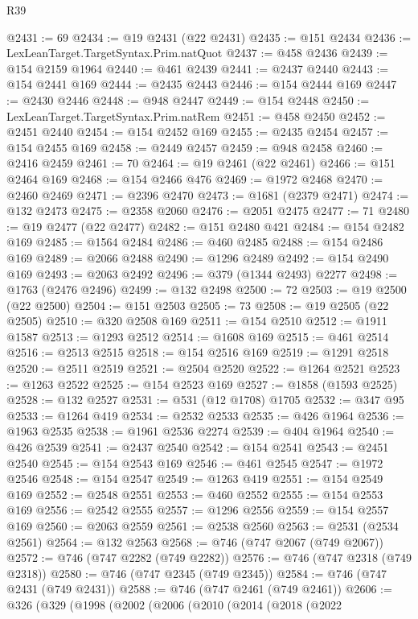 \begin{lexlean}{R39}
\begin{coremodule}
@2431 := 69
@2434 := @19 @2431 (@22 @2431)
@2435 := @151 @2434
@2436 := LexLeanTarget.TargetSyntax.Prim.natQuot
@2437 := @458 @2436
@2439 := @154 @2159 @1964
@2440 := @461 @2439
@2441 := @2437 @2440
@2443 := @154 @2441 @169
@2444 := @2435 @2443
@2446 := @154 @2444 @169
@2447 := @2430 @2446
@2448 := @948 @2447
@2449 := @154 @2448
@2450 := LexLeanTarget.TargetSyntax.Prim.natRem
@2451 := @458 @2450
@2452 := @2451 @2440
@2454 := @154 @2452 @169
@2455 := @2435 @2454
@2457 := @154 @2455 @169
@2458 := @2449 @2457
@2459 := @948 @2458
@2460 := @2416 @2459
@2461 := 70
@2464 := @19 @2461 (@22 @2461)
@2466 := @151 @2464 @169
@2468 := @154 @2466 @476
@2469 := @1972 @2468
@2470 := @2460 @2469
@2471 := @2396 @2470
@2473 := @1681 (@2379 @2471)
@2474 := @132 @2473
@2475 := @2358 @2060
@2476 := @2051 @2475
@2477 := 71
@2480 := @19 @2477 (@22 @2477)
@2482 := @151 @2480 @421
@2484 := @154 @2482 @169
@2485 := @1564 @2484
@2486 := @460 @2485
@2488 := @154 @2486 @169
@2489 := @2066 @2488
@2490 := @1296 @2489
@2492 := @154 @2490 @169
@2493 := @2063 @2492
@2496 := @379 (@1344 @2493) @2277
@2498 := @1763 (@2476 @2496)
@2499 := @132 @2498
@2500 := 72
@2503 := @19 @2500 (@22 @2500)
@2504 := @151 @2503
@2505 := 73
@2508 := @19 @2505 (@22 @2505)
@2510 := @320 @2508 @169
@2511 := @154 @2510
@2512 := @1911 @1587
@2513 := @1293 @2512
@2514 := @1608 @169
@2515 := @461 @2514
@2516 := @2513 @2515
@2518 := @154 @2516 @169
@2519 := @1291 @2518
@2520 := @2511 @2519
@2521 := @2504 @2520
@2522 := @1264 @2521
@2523 := @1263 @2522
@2525 := @154 @2523 @169
@2527 := @1858 (@1593 @2525)
@2528 := @132 @2527
@2531 := @531 (@12 @1708) @1705
@2532 := @347 @95
@2533 := @1264 @419
@2534 := @2532 @2533
@2535 := @426 @1964
@2536 := @1963 @2535
@2538 := @1961 @2536 @2274
@2539 := @404 @1964
@2540 := @426 @2539
@2541 := @2437 @2540
@2542 := @154 @2541
@2543 := @2451 @2540
@2545 := @154 @2543 @169
@2546 := @461 @2545
@2547 := @1972 @2546
@2548 := @154 @2547
@2549 := @1263 @419
@2551 := @154 @2549 @169
@2552 := @2548 @2551
@2553 := @460 @2552
@2555 := @154 @2553 @169
@2556 := @2542 @2555
@2557 := @1296 @2556
@2559 := @154 @2557 @169
@2560 := @2063 @2559
@2561 := @2538 @2560
@2563 := @2531 (@2534 @2561)
@2564 := @132 @2563
@2568 := @746 (@747 @2067 (@749 @2067))
@2572 := @746 (@747 @2282 (@749 @2282))
@2576 := @746 (@747 @2318 (@749 @2318))
@2580 := @746 (@747 @2345 (@749 @2345))
@2584 := @746 (@747 @2431 (@749 @2431))
@2588 := @746 (@747 @2461 (@749 @2461))
@2606 := @326
    (@329
      (@1998
        (@2002
          (@2006
            (@2010
              (@2014
                (@2018
                  (@2022

\end{coremodule}
\end{lexlean}
